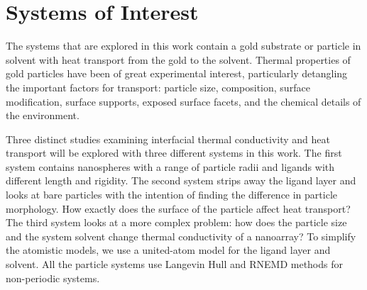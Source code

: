 \section{Systems of Interest}
The systems that are explored in this work contain a gold substrate or particle in solvent with heat transport from the gold to the solvent. 
Thermal properties of gold particles have been of great experimental interest, particularly detangling the important factors for transport: particle size,\cite{Zanjani2014,Liu2015,Wilhelmsen2015,Stocker2016,Tascini2016} composition,\cite{Wilson:2002uq, Ong:2013rt} surface modification,\cite{kuang:AuThl,Ong:2013rt,Ong:2014yq,Liu2015,Stocker2016,Hannah2015,Park2016,Leitner2017} surface supports,\cite{Park2012} exposed surface facets,\cite{Hannah2015} and the chemical details of the environment.\cite{Ge2006,Park2012,Ong:2013rt,Ong:2014yq,Wilhelmsen2015,Park2016} 

Three distinct studies examining interfacial thermal conductivity and heat transport will be explored with three different systems in this work.
The first system contains nanospheres with a range of particle radii and ligands with different length and rigidity.\cite{Stocker2016}
The second system strips away the ligand layer and looks at bare particles with the intention of finding the difference in particle morphology.\cite{Neidhart}
How exactly does the surface of the particle affect heat transport?
The third system looks at a more complex problem: how does the particle size and the system solvent change thermal conductivity of a nanoarray?
To simplify the atomistic models, we use a united-atom model for the ligand layer and solvent.
All the particle systems use Langevin Hull\cite{Vardeman2011} and RNEMD methods for non-periodic systems.\cite{Stocker:2014qq}

